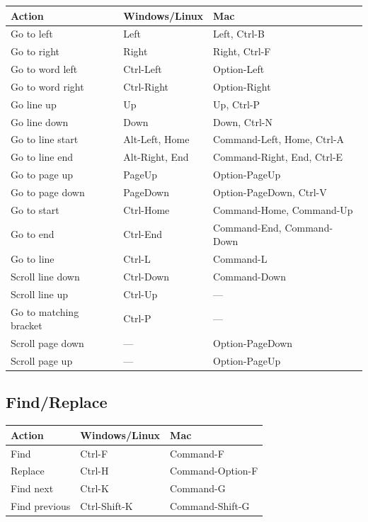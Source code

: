 \documentclass[
]{book}
\begin{document}
\begin{longtable}[]{@{}lll@{}}
\toprule()
Action & Windows/Linux & Mac \\
\midrule()
\endhead
Go to left & Left & Left, Ctrl-B \\
Go to right & Right & Right, Ctrl-F \\
Go to word left & Ctrl-Left & Option-Left \\
Go to word right & Ctrl-Right & Option-Right \\
Go line up & Up & Up, Ctrl-P \\
Go line down & Down & Down, Ctrl-N \\
Go to line start & Alt-Left, Home & Command-Left, Home, Ctrl-A \\
Go to line end & Alt-Right, End & Command-Right, End, Ctrl-E \\
Go to page up & PageUp & Option-PageUp \\
Go to page down & PageDown & Option-PageDown, Ctrl-V \\
Go to start & Ctrl-Home & Command-Home, Command-Up \\
Go to end & Ctrl-End & Command-End, Command-Down \\
Go to line & Ctrl-L & Command-L \\
Scroll line down & Ctrl-Down & Command-Down \\
Scroll line up & Ctrl-Up & --- \\
Go to matching bracket & Ctrl-P & --- \\
Scroll page down & --- & Option-PageDown \\
Scroll page up & --- & Option-PageUp \\
\bottomrule()
\end{longtable}

\hypertarget{findreplace}{%
\subsection{Find/Replace}\label{findreplace}}

\begin{longtable}[]{@{}lll@{}}
\toprule()
Action & Windows/Linux & Mac \\
\midrule()
\endhead
Find & Ctrl-F & Command-F \\
Replace & Ctrl-H & Command-Option-F \\
Find next & Ctrl-K & Command-G \\
Find previous & Ctrl-Shift-K & Command-Shift-G \\
\bottomrule()
\end{longtable}
\end{document}
